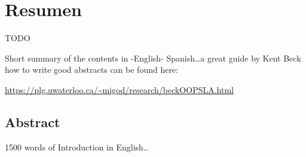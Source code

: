 \begingroup
\let\clearpage\relax
\let\cleardoublepage\relax
\let\cleardoublepage\relax

\chapter*{Resumen}

TODO

Short summary of the contents in -English- Spanish\dots a great guide by 
Kent Beck how to write good abstracts can be found here:  
\begin{center}
\url{https://plg.uwaterloo.ca/~migod/research/beckOOPSLA.html}
\end{center}

\vfill

\begin{otherlanguage}{english}
\chapter*{Abstract}
1500 words of Introduction in English\dots 
\end{otherlanguage}

\endgroup			

\vfill